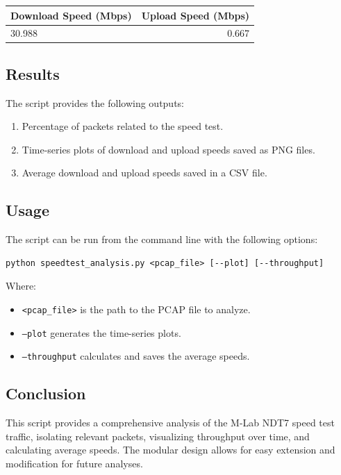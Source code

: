 \documentclass{article}
\begin{document}
\begin{center}
\begin{tabular}{|l|r|}
\hline
Download Speed (Mbps) & Upload Speed (Mbps) \\
\hline
30.988 & 0.667 \\
\hline
\end{tabular}
\end{center}

\subsection{Results}

The script provides the following outputs:

\begin{enumerate}
    \item Percentage of packets related to the speed test.
    \item Time-series plots of download and upload speeds saved as PNG files.
    \item Average download and upload speeds saved in a CSV file.
\end{enumerate}

\subsection{Usage}

The script can be run from the command line with the following options:

\begin{verbatim}
python speedtest_analysis.py <pcap_file> [--plot] [--throughput]
\end{verbatim}

Where:
\begin{itemize}
    \item \texttt{<pcap\_file>} is the path to the PCAP file to analyze.
    \item \texttt{--plot} generates the time-series plots.
    \item \texttt{--throughput} calculates and saves the average speeds.
\end{itemize}

\subsection{Conclusion}

This script provides a comprehensive analysis of the M-Lab NDT7 speed test traffic, isolating relevant packets, visualizing throughput over time, and calculating average speeds. The modular design allows for easy extension and modification for future analyses.
\end{document}
